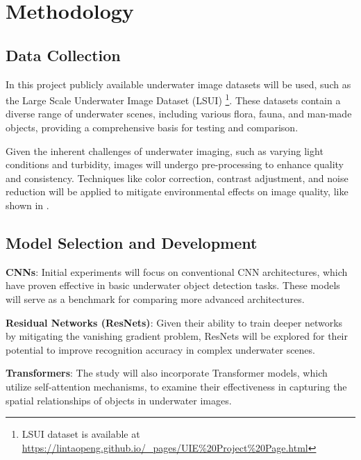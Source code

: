 \section{Methodology}

\subsection{Data Collection}

In this project publicly available underwater image datasets will be used,
such as the Large Scale Underwater Image Dataset (LSUI) 
\parencite{pengUshapeTransformerUnderwater2023}
\footnote{LSUI dataset is available at
\url{https://lintaopeng.github.io/_pages/UIE\%20Project\%20Page.html}}.
These datasets contain a diverse range of underwater scenes, including various
flora, fauna, and man-made objects, providing a comprehensive basis for testing
and comparison.

Given the inherent challenges of underwater imaging,
such as varying light conditions and turbidity, images will undergo
pre-processing to enhance quality and consistency.
Techniques like color correction, contrast adjustment,
and noise reduction will be applied to mitigate environmental effects on
image quality, like shown in \parencite{tengUnderwaterTargetRecognition2020}.

\subsection{Model Selection and Development}

\begin{APAitemize}
    \item \textbf{CNNs}: Initial experiments will focus on conventional
     CNN architectures, which have proven effective in basic underwater object
     detection tasks.
     These models will serve as a benchmark for comparing more advanced
     architectures. %

    \item \textbf{Residual Networks (ResNets)}: Given their ability to train
     deeper networks by mitigating the vanishing gradient problem,
     ResNets will be explored for their potential to improve recognition
     accuracy in complex underwater scenes. %

     \item \textbf{Transformers}: The study will also incorporate Transformer
     models, which utilize self-attention mechanisms, to examine their
     effectiveness in capturing the spatial relationships of objects in
     underwater images. %
\end{APAitemize}

